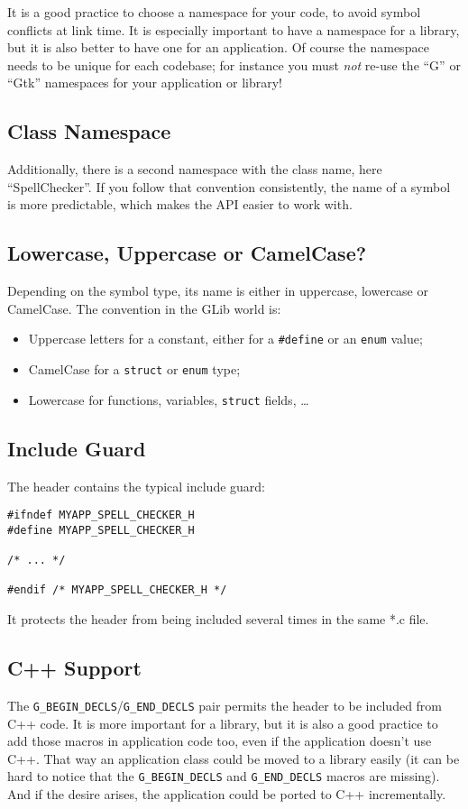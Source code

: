 It is a good practice to choose a namespace for your code, to avoid symbol conflicts at link time. It is especially important to have a namespace for a library, but it is also better to have one for an application. Of course the namespace needs to be unique for each codebase; for instance you must \emph{not} re-use the ``G'' or ``Gtk'' namespaces for your application or library!

\subsection{Class Namespace}
Additionally, there is a second namespace with the class name, here ``SpellChecker''. If you follow that convention consistently, the name of a symbol is more predictable, which makes the API easier to work with.

\subsection{Lowercase, Uppercase or CamelCase?}
Depending on the symbol type, its name is either in uppercase, lowercase or CamelCase. The convention in the GLib world is:
\begin{itemize}
  \item Uppercase letters for a constant, either for a \lstinline{#define} or an \lstinline{enum} value;
  \item CamelCase for a \lstinline{struct} or \lstinline{enum} type;
  \item Lowercase for functions, variables, \lstinline{struct} fields, …
\end{itemize}

\subsection{Include Guard}
The header contains the typical include guard:

\begin{lstlisting}
#ifndef MYAPP_SPELL_CHECKER_H
#define MYAPP_SPELL_CHECKER_H

/* ... */

#endif /* MYAPP_SPELL_CHECKER_H */
\end{lstlisting}

It protects the header from being included several times in the same *.c file.

\subsection{C++ Support}
The \lstinline{G_BEGIN_DECLS}/\lstinline{G_END_DECLS} pair permits the header to be included from C++ code. It is more important for a library, but it is also a good practice to add those macros in application code too, even if the application doesn't use C++. That way an application class could be moved to a library easily (it can be hard to notice that the \lstinline{G_BEGIN_DECLS} and \lstinline{G_END_DECLS} macros are missing). And if the desire arises, the application could be ported to C++ incrementally.

